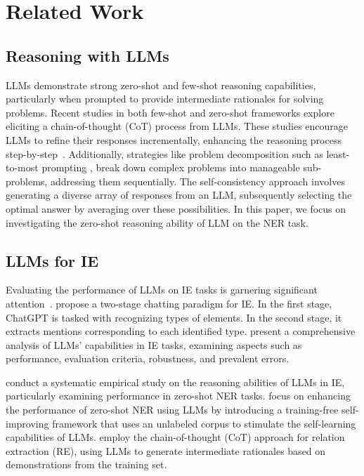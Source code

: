 \section{Related Work}

\subsection{Reasoning with LLMs}
\acp{LLM} demonstrate strong zero-shot and few-shot reasoning capabilities, particularly when prompted to provide intermediate rationales for solving problems. Recent studies in both few-shot and zero-shot frameworks explore eliciting a chain-of-thought (CoT) process from LLMs. These studies encourage LLMs to refine their responses incrementally, enhancing the reasoning process step-by-step~\citep{wei2022chain,zhang2022automatic,wang2022towards,kojima2022large}.
Additionally, strategies like problem decomposition such as least-to-most prompting \cite{zhou2022least}, break down complex problems into manageable sub-problems, addressing them sequentially. 
The self-consistency approach \cite{wang2022self} involves generating a diverse array of responses from an LLM, subsequently selecting the optimal answer by averaging over these possibilities.
In this paper, we focus on investigating the zero-shot reasoning ability of \ac{LLM} on the \ac{NER} task. 

\subsection{LLMs for IE}
Evaluating the performance of \acp{LLM} on IE tasks is garnering significant attention~\citep{li2023evaluating,DBLP:conf/aaai/MaWKBP024,laskar2023systematic,DBLP:conf/www/ZhangZGH24,DBLP:conf/aaai/WuKWLLC24,wang2023gpt}. \citet{wei2023zero} propose a two-stage chatting paradigm for IE. In the first stage, ChatGPT is tasked with recognizing types of elements. In the second stage, it extracts mentions corresponding to each identified type. \citet{DBLP:journals/corr/abs-2305-14450} present a comprehensive analysis of \ac{LLM}s' capabilities in IE tasks, examining aspects such as performance, evaluation criteria, robustness, and prevalent errors. 

\citet{DBLP:conf/emnlp/XieLZZLW23} conduct a systematic empirical study on the reasoning abilities of \acp{LLM} in IE, particularly examining performance in zero-shot \ac{NER} tasks.
\citet{DBLP:journals/corr/abs-2311-08921} focus on enhancing the performance of zero-shot \ac{NER} using \acp{LLM} by introducing a training-free self-improving framework that uses an unlabeled corpus to stimulate the self-learning capabilities of \acp{LLM}.
\citet{wan2023gpt} employ the chain-of-thought (CoT) approach for relation extraction (RE), using \acp{LLM} to generate intermediate rationales based on demonstrations from the training set.

